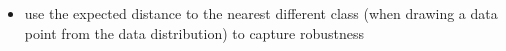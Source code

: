 \begin{frame}
\begin{itemize}
  \item \citet{gilmer2018adversarial} use the expected distance to
 the nearest different class (when drawing a data point from the data
 distribution) to capture robustness
\end{itemize}
\end{frame}




    
